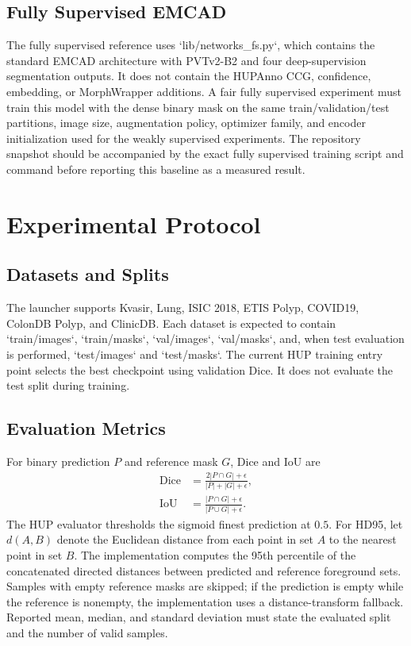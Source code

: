 \documentclass[journal]{IEEEtran}
\begin{document}
\subsection{Fully Supervised EMCAD}
The fully supervised reference uses `lib/networks_fs.py`, which contains the standard EMCAD architecture with PVTv2-B2 and four deep-supervision segmentation outputs. It does not contain the HUPAnno CCG, confidence, embedding, or MorphWrapper additions. A fair fully supervised experiment must train this model with the dense binary mask on the same train/validation/test partitions, image size, augmentation policy, optimizer family, and encoder initialization used for the weakly supervised experiments. The repository snapshot should be accompanied by the exact fully supervised training script and command before reporting this baseline as a measured result.

\section{Experimental Protocol}
\subsection{Datasets and Splits}
The launcher supports Kvasir, Lung, ISIC 2018, ETIS Polyp, COVID19, ColonDB Polyp, and ClinicDB. Each dataset is expected to contain `train/images`, `train/masks`, `val/images`, `val/masks`, and, when test evaluation is performed, `test/images` and `test/masks`. The current HUP training entry point selects the best checkpoint using validation Dice. It does not evaluate the test split during training.

\subsection{Evaluation Metrics}
For binary prediction $P$ and reference mask $G$, Dice and IoU are
\begin{align}
 \operatorname{Dice}&=\frac{2|P\cap G|+\epsilon}{|P|+|G|+\epsilon},\\
 \operatorname{IoU}&=\frac{|P\cap G|+\epsilon}{|P\cup G|+\epsilon}.
\end{align}
The HUP evaluator thresholds the sigmoid finest prediction at $0.5$. For HD95, let $d(A,B)$ denote the Euclidean distance from each point in set $A$ to the nearest point in set $B$. The implementation computes the 95th percentile of the concatenated directed distances between predicted and reference foreground sets. Samples with empty reference masks are skipped; if the prediction is empty while the reference is nonempty, the implementation uses a distance-transform fallback. Reported mean, median, and standard deviation must state the evaluated split and the number of valid samples.
\end{document}

